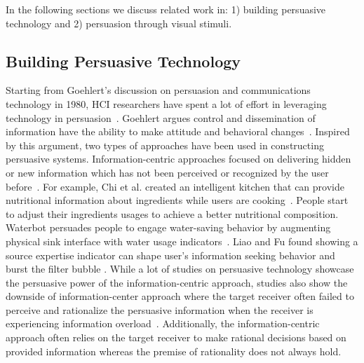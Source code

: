 
In the following sections we discuss related work in: 1) building persuasive technology and 2) persuasion through visual stimuli.

\subsection{Building Persuasive Technology}
Starting from Goehlert's discussion on persuasion and communications technology in 1980, HCI researchers have spent a lot of effort in leveraging technology in persuasion~\cite{goehlert1980information}. Goehlert argues control and dissemination of information have the ability to make attitude and behavioral changes~\cite{goehlert1980information}. Inspired by this argument, two types of approaches have been used in constructing persuasive systems. Information-centric approaches focused on delivering hidden or new information which has not been perceived or recognized by the user before~\cite{LeeKF11}. For example, Chi et al. created an intelligent kitchen that can provide nutritional information about ingredients while users are cooking~\cite{chi2007enabling}. People start to adjust their ingredients usages to achieve a better nutritional composition. Waterbot persuades people to engage water-saving behavior by augmenting physical sink interface with water usage indicators~\cite{arroyo2005waterbot}. Liao and Fu found showing a source expertise indicator can shape user's information seeking behavior and burst the filter bubble \cite{liao2014expert}. While a lot of studies on persuasive technology showcase the persuasive power of the information-centric approach, studies also show the downside of information-center approach where the target receiver often failed to perceive and rationalize the persuasive information when the receiver is experiencing information overload~\cite{goehlert1980information,LeeKF11}. Additionally, the information-centric approach often relies on the target receiver to make rational decisions based on provided information whereas the premise of rationality does not always hold.

